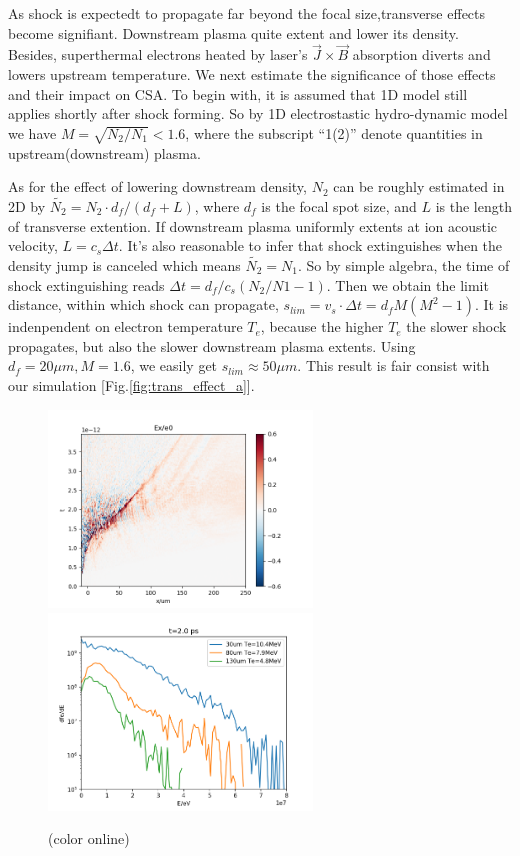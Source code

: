 \documentclass[12pt]{iopart}
\begin{document}
As shock is expectedt to propagate far beyond the focal size,transverse effects become signifiant. Downstream plasma quite extent and lower its density. Besides, superthermal electrons heated by laser's $\vec{J}\times \vec{B} $ absorption\cite{gibbon_short_2005} diverts and lowers upstream temperature. We next estimate the significance of those effects and their impact on CSA. To begin with, it is assumed that 1D model still applies shortly after shock forming. So by 1D electrostastic hydro-dynamic model\cite{tidman_shock_1971,zhang_quasi-monoenergetic_2016} we have $M=\sqrt{N_2 / N_1}<1.6$, where the subscript ``1(2)'' denote quantities in upstream(downstream) plasma. 

As for the effect of lowering downstream density, $N_2$ can be roughly estimated in 2D by $\tilde{N_2}=N_2 \cdot d_f\big/(d_f+L)$, where $d_f$ is the focal spot size, and $L$ is the length of transverse extention. If downstream plasma uniformly extents at ion acoustic velocity, $L=c_s\Delta t$. It's also reasonable to infer that shock extinguishes when the density jump is canceled which means $\tilde{N_2}=N_1$. So by simple algebra, the time of shock extinguishing reads $\Delta t=d_f/c_s(N_2/N1-1)$. Then we obtain the limit distance, within which shock can propagate, $s_{lim}=v_s \cdot \Delta t=d_fM(M^2-1)$. It is indenpendent on electron temperature $T_e$, because the higher $T_e$ the slower shock propagates, but also the slower downstream plasma extents. Using $d_f=20\mu m,M=1.6$, we easily get $s_{lim}\approx 50\mu m$. This result is fair consist with our simulation [Fig.\ref{fig:trans_effect_a}].


\begin{figure}[htbp]
    \centering
    \includegraphics[width=7cm]{ex_trace.png}\label{fig:trans_effect_a}
    \includegraphics[width=7cm]{Te_x.png}\label{fig:trans_effect_b}
    \caption{(color online)} 
\end{figure}
\end{document}
